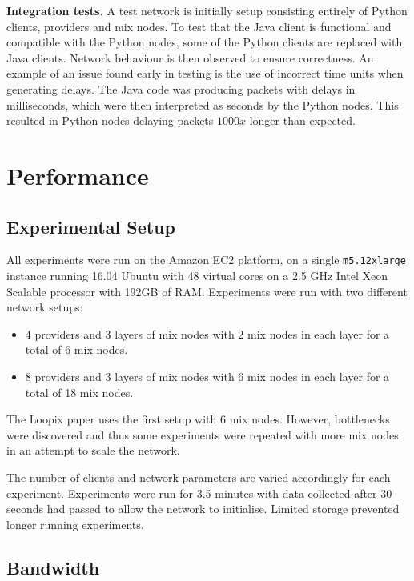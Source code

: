 \documentclass[final,dissertation.tex]{subfiles}
\begin{document}
\textbf{Integration tests.} A test network is initially setup consisting entirely of Python clients, providers and mix nodes. To test that the Java client is functional and compatible with the Python nodes, some of the Python clients are replaced with Java clients. Network behaviour is then observed to ensure correctness. An example of an issue found early in testing is the use of incorrect time units when generating delays. The Java code was producing packets with delays in milliseconds, which were then interpreted as seconds by the Python nodes. This resulted in Python nodes delaying packets $1000x$ longer than expected.

\section{Performance}

\subsection{Experimental Setup}

All experiments were run on the Amazon EC2 platform, on a single \verb|m5.12xlarge| instance running 16.04 Ubuntu with 48 virtual cores on a 2.5 GHz Intel Xeon Scalable processor with 192GB of RAM. Experiments were run with two different network setups: 

\begin{itemize}
	\item 4 providers and 3 layers of mix nodes with 2 mix nodes in each layer for a total of 6 mix nodes.
	\item 8 providers and 3 layers of mix nodes with 6 mix nodes in each layer for a total of 18 mix nodes.
\end{itemize}

The Loopix paper uses the first setup with 6 mix nodes. However, bottlenecks were discovered and thus some experiments were repeated with more mix nodes in an attempt to scale the network.

The number of clients and network parameters are varied accordingly for each experiment. Experiments were run for 3.5 minutes with data collected after 30 seconds had passed to allow the network to initialise. Limited storage prevented longer running experiments.

\subsection{Bandwidth}
 
\end{document}
